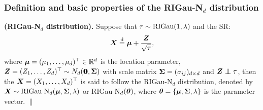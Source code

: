 \subsubsection{Definition and basic properties of the RIGau-N$_d$ distribution}        %

\begin{definition}{\rm \textbf{(RIGau-N$_d$ distribution).} Suppose that $\tau \sim \mbox{RIGau}(1, \lambda)$ and the SR:
$$
    {\boldsymbol{X}} \stackrel{{\rm d}}{=} {\boldsymbol{\mu}} + \frac{{\boldsymbol{Z}}}{\sqrt{\tau}}, 
$$
where ${\boldsymbol{\mu}} = (\mu_1, \dots, \mu_d)^\top \in {\mathbb{R}}^d$ is the location parameter, ${\boldsymbol{Z}} = (Z_1, \dots, Z_d)^\top \sim N_d({\bf 0}\!\!\!{\bf 0}, {\mbox{\boldmath$\Sigma$}})$ with scale matrix ${\mbox{\boldmath$\Sigma$}} = (\sigma_{ij})_{d\times d}$ and $\ibZ \inde \tau$, then the \trv ${\boldsymbol{X}} = (X_1, \dots, X_d)^\top$ is said to follow the RIGau-N$_d$ distribution, denoted by ${\boldsymbol{X}} \sim \mbox{RIGau-N}_d({\boldsymbol{\mu}}, {\mbox{\boldmath$\Sigma$}}, \lambda)$ or RIGau-N$_d({\boldsymbol{\theta}})$, where ${\boldsymbol{\theta}} = \{{\boldsymbol{\mu}}, {\mbox{\boldmath$\Sigma$}}, \lambda\}$ is the parameter vector. \hfill $\|$
}\end{definition}

